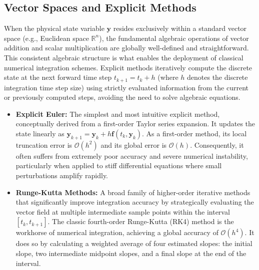 \subsection{Vector Spaces and Explicit Methods}
When the physical state variable $\bm{y}$ resides exclusively within a standard vector space (e.g., Euclidean space $\mathbb{R}^n$), the fundamental algebraic operations of vector addition and scalar multiplication are globally well-defined and straightforward. This consistent algebraic structure is what enables the deployment of classical numerical integration schemes.
Explicit methods iteratively compute the discrete state at the next forward time step $t_{k+1} = t_k + h$ (where $h$ denotes the discrete integration time step size) using strictly evaluated information from the current or previously computed steps, avoiding the need to solve algebraic equations.
\begin{itemize}
    \item \textbf{Explicit Euler:} The simplest and most intuitive explicit method, conceptually derived from a first-order Taylor series expansion. It updates the state linearly as $\bm{y}_{k+1} = \bm{y}_k + h \bm{f}(t_k, \bm{y}_k)$. As a first-order method, its local truncation error is $\mathcal{O}(h^2)$ and its global error is $\mathcal{O}(h)$. Consequently, it often suffers from extremely poor accuracy and severe numerical instability, particularly when applied to stiff differential equations where small perturbations amplify rapidly.
    \item \textbf{Runge-Kutta Methods:} A broad family of higher-order iterative methods that significantly improve integration accuracy by strategically evaluating the vector field at multiple intermediate sample points within the interval $[t_k, t_{k+1}]$. The classic fourth-order Runge-Kutta (RK4) method is the workhorse of numerical integration, achieving a global accuracy of $\mathcal{O}(h^4)$. It does so by calculating a weighted average of four estimated slopes: the initial slope, two intermediate midpoint slopes, and a final slope at the end of the interval.
\end{itemize}

